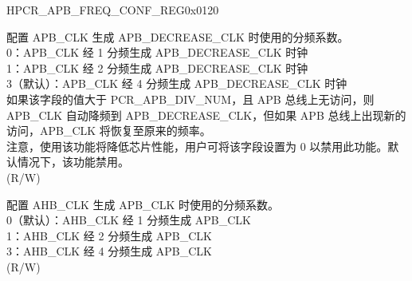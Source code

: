 \begin{register}{H}{PCR\_APB\_FREQ\_CONF\_REG}{0x0120}\label{regdesc:PCRAPBFREQCONFREG}
%
%
%
\regnewline%
\begin{regdesc}\begin{reglist}
 \label{fielddesc:PCRAPBDECREASEDIVNUM}\item [PCR\_APB\_DECREASE\_DIV\_NUM] 配置 APB\_CLK 生成 APB\_DECREASE\_CLK 时使用的分频系数。\\
0：APB\_CLK 经 1 分频生成 APB\_DECREASE\_CLK 时钟\\
1：APB\_CLK 经 2 分频生成 APB\_DECREASE\_CLK 时钟\\
3（默认）：APB\_CLK 经 4 分频生成 APB\_DECREASE\_CLK 时钟\\
如果该字段的值大于 PCR\_APB\_DIV\_NUM，且 APB 总线上无访问，则 APB\_CLK 自动降频到 APB\_DECREASE\_CLK，但如果 APB 总线上出现新的访问，APB\_CLK 将恢复至原来的频率。\\
注意，使用该功能将降低芯片性能，用户可将该字段设置为 0 以禁用此功能。默认情况下，该功能禁用。 \\(R/W)
\label{fielddesc:PCRAPBDIVNUM}\item [PCR\_APB\_DIV\_NUM] 配置 AHB\_CLK 生成 APB\_CLK 时使用的分频系数。\\
0（默认）：AHB\_CLK 经 1 分频生成 APB\_CLK\\
1：AHB\_CLK 经 2 分频生成 APB\_CLK\\
3：AHB\_CLK 经 4 分频生成 APB\_CLK\\
(R/W)
\end{reglist}\end{regdesc}
\end{register}


